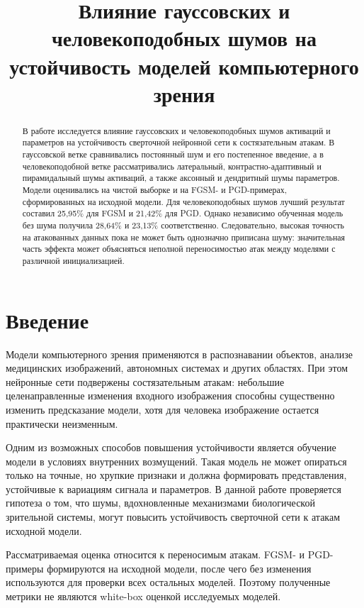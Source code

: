 \documentclass[a4paper]{article}
\title{Влияние гауссовских и человекоподобных шумов на устойчивость моделей компьютерного зрения}
\author{}
\date{}
\begin{document}
\maketitle

\begin{abstract}
В работе исследуется влияние гауссовских и человекоподобных шумов активаций и параметров на устойчивость сверточной нейронной сети к состязательным атакам. В гауссовской ветке сравнивались постоянный шум и его постепенное введение, а в человекоподобной ветке рассматривались латеральный, контрастно-адаптивный и пирамидальный шумы активаций, а также аксонный и дендритный шумы параметров. Модели оценивались на чистой выборке и на FGSM- и PGD-примерах, сформированных на исходной модели. Для человекоподобных шумов лучший результат составил 25{,}95\% для FGSM и 21{,}42\% для PGD. Однако независимо обученная модель без шума получила 28{,}64\% и 23{,}13\% соответственно. Следовательно, высокая точность на атакованных данных пока не может быть однозначно приписана шуму: значительная часть эффекта может объясняться неполной переносимостью атак между моделями с различной инициализацией.
\end{abstract}

\tableofcontents

\section{Введение}

Модели компьютерного зрения применяются в распознавании объектов, анализе медицинских изображений, автономных системах и других областях. При этом нейронные сети подвержены состязательным атакам: небольшие целенаправленные изменения входного изображения способны существенно изменить предсказание модели, хотя для человека изображение остается практически неизменным.

Одним из возможных способов повышения устойчивости является обучение модели в условиях внутренних возмущений. Такая модель не может опираться только на точные, но хрупкие признаки и должна формировать представления, устойчивые к вариациям сигнала и параметров. В данной работе проверяется гипотеза о том, что шумы, вдохновленные механизмами биологической зрительной системы, могут повысить устойчивость сверточной сети к атакам исходной модели.

Рассматриваемая оценка относится к переносимым атакам. FGSM- и PGD-примеры формируются на исходной модели, после чего без изменения используются для проверки всех остальных моделей. Поэтому полученные метрики не являются white-box оценкой исследуемых моделей.
\end{document}
